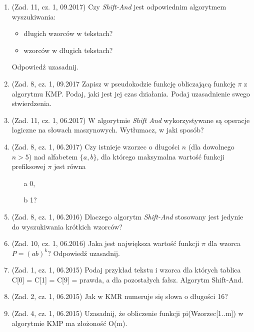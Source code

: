 \documentclass[10pt]{article}%
\begin{document}
\begin{enumerate}

\item (Zad. 11, cz. 1, 09.2017) Czy \textit{Shift-And} jest odpowiednim algorytmem wyszukiwania:
\begin{itemize}
\item długich wzorców w tekstach?
\item wzorców w długich tekstach?
\end{itemize}
Odpowiedź uzasadnij.

 
\item (Zad. 8, cz. 1, 09.2017 Zapisz w pseudokodzie funkcję obliczającą funkcję $\pi$ z algorytmu KMP. Podaj, jaki jest jej czas działania. Podaj uzasadnienie swego stwierdzenia.

\item (Zad. 11, cz. 1, 06.2017) W algorytmie \emph{Shift And} wykorzystywane są operacje logiczne na słowach maszynowych. Wytłumacz, w jaki sposób?

\item (Zad. 8, cz. 1, 06.2017) Czy istnieje wzorzec o długości $n$ (dla dowolnego $n>5$) nad alfabetem $\{a,b\}$, dla którego maksymalna wartość funkcji prefiksowej $\pi$ jest równa 
\begin{itemize}
\item[a] 0,
\item[b] 1?
\end{itemize}

\item (Zad. 8, cz. 1, 06.2016) Dlaczego algorytm \textit{Shift-And} stosowany jest jedynie do wyszukiwania krótkich wzorców?

\item (Zad. 10, cz. 1, 06.2016) Jaka jest największa wartość funkcji $\pi$ dla wzorca $ P = (ab)^k$? Odpowiedź uzasadnij.

\item (Zad. 1, cz. 1, 06.2015) Podaj przykład tekstu i wzorca dla których tablica C[0] = C[1] = C[9] = prawda, a dla pozostałych fałsz. Algorytm Shift-And.

\item (Zad. 2, cz. 1, 06.2015) Jak w KMR numeruje się słowa o długości 16?

\item (Zad. 4, cz. 1, 06.2015) Uzasadnij, że obliczenie funkcji pi(Wzorzec[1..m]) w algorytmie KMP ma złożoność O(m).

\end{enumerate}
\end{document}
